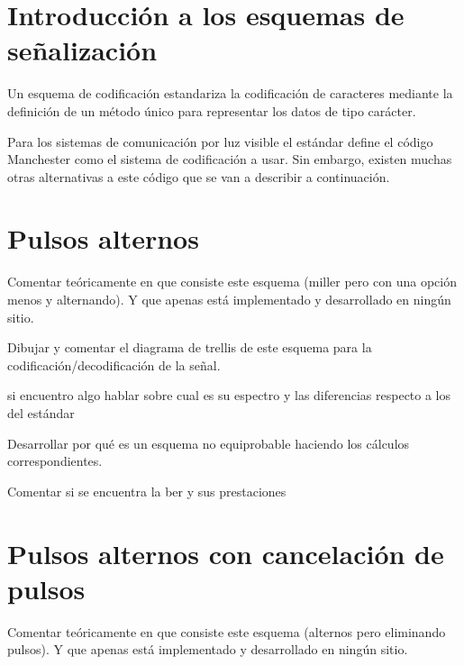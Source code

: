 
\label{chp:App}
\minitoc

\section{Introducción a los esquemas de señalización}
Un esquema de codificación estandariza la codificación de caracteres mediante la definición de un 
método único para representar los datos de tipo carácter. 

Para los sistemas de comunicación por luz visible el estándar define el código Manchester como el sistema de codificación a 
usar. Sin embargo, existen muchas otras alternativas a este código que se van a describir a continuación.

\section{Pulsos alternos}
Comentar teóricamente en que consiste este esquema (miller pero con una opción menos y alternando).
Y que apenas está implementado y desarrollado en ningún sitio.

Dibujar y comentar el diagrama de trellis de este esquema para la codificación/decodificación de la señal.

si encuentro algo hablar sobre cual es su espectro y las diferencias respecto a los del estándar

Desarrollar por qué es un esquema no equiprobable haciendo los cálculos correspondientes.

Comentar si se encuentra la ber y sus prestaciones

\section{Pulsos alternos con cancelación de pulsos}
Comentar teóricamente en que consiste este esquema (alternos pero eliminando pulsos).
Y que apenas está implementado y desarrollado en ningún sitio.

